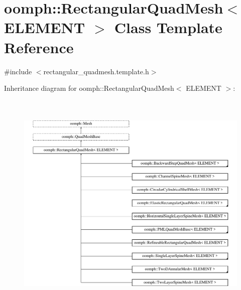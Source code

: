 \hypertarget{classoomph_1_1RectangularQuadMesh}{}\section{oomph\+:\+:Rectangular\+Quad\+Mesh$<$ E\+L\+E\+M\+E\+NT $>$ Class Template Reference}
\label{classoomph_1_1RectangularQuadMesh}


{\ttfamily \#include $<$rectangular\+\_\+quadmesh.\+template.\+h$>$}

Inheritance diagram for oomph\+:\+:Rectangular\+Quad\+Mesh$<$ E\+L\+E\+M\+E\+NT $>$\+:\begin{figure}[H]
\begin{center}
\leavevmode
\includegraphics[height=10.865671cm]{classoomph_1_1RectangularQuadMesh}
\end{center}
\end{figure}
